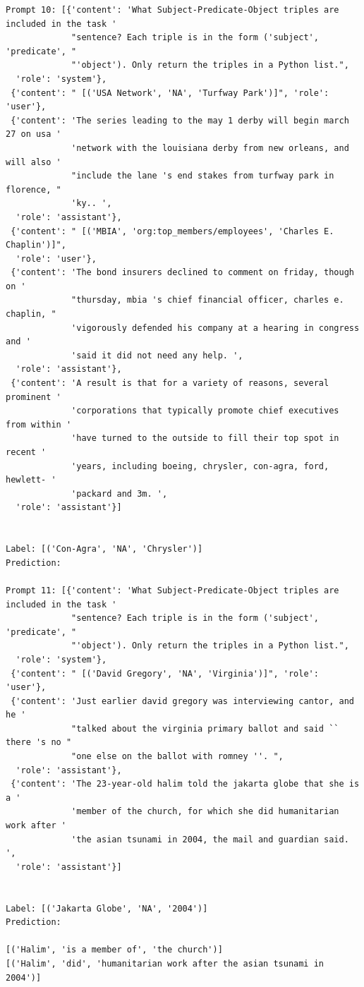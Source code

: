 \documentclass{article}
\begin{document}
\begin{lstlisting}
Prompt 10: [{'content': 'What Subject-Predicate-Object triples are included in the task '
             "sentence? Each triple is in the form ('subject', 'predicate', "
             "'object'). Only return the triples in a Python list.",
  'role': 'system'},
 {'content': " [('USA Network', 'NA', 'Turfway Park')]", 'role': 'user'},
 {'content': 'The series leading to the may 1 derby will begin march 27 on usa '
             'network with the louisiana derby from new orleans, and will also '
             "include the lane 's end stakes from turfway park in florence, "
             'ky.. ',
  'role': 'assistant'},
 {'content': " [('MBIA', 'org:top_members/employees', 'Charles E. Chaplin')]",
  'role': 'user'},
 {'content': 'The bond insurers declined to comment on friday, though on '
             "thursday, mbia 's chief financial officer, charles e. chaplin, "
             'vigorously defended his company at a hearing in congress and '
             'said it did not need any help. ',
  'role': 'assistant'},
 {'content': 'A result is that for a variety of reasons, several prominent '
             'corporations that typically promote chief executives from within '
             'have turned to the outside to fill their top spot in recent '
             'years, including boeing, chrysler, con-agra, ford, hewlett- '
             'packard and 3m. ',
  'role': 'assistant'}]


Label: [('Con-Agra', 'NA', 'Chrysler')]
Prediction: 

Prompt 11: [{'content': 'What Subject-Predicate-Object triples are included in the task '
             "sentence? Each triple is in the form ('subject', 'predicate', "
             "'object'). Only return the triples in a Python list.",
  'role': 'system'},
 {'content': " [('David Gregory', 'NA', 'Virginia')]", 'role': 'user'},
 {'content': 'Just earlier david gregory was interviewing cantor, and he '
             "talked about the virginia primary ballot and said `` there 's no "
             "one else on the ballot with romney ''. ",
  'role': 'assistant'},
 {'content': 'The 23-year-old halim told the jakarta globe that she is a '
             'member of the church, for which she did humanitarian work after '
             'the asian tsunami in 2004, the mail and guardian said. ',
  'role': 'assistant'}]


Label: [('Jakarta Globe', 'NA', '2004')]
Prediction: 

[('Halim', 'is a member of', 'the church')]
[('Halim', 'did', 'humanitarian work after the asian tsunami in 2004')]


\end{lstlisting}
\end{document}
